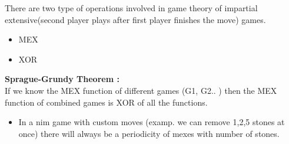 \documentclass[../Notes.tex]{subfiles}
\begin{document}
There are two type of operations involved in game theory of impartial extensive(second player plays after first player finishes the move) games.
\begin{itemize}
	\item MEX
	\item XOR
\end{itemize}

\textbf{Sprague-Grundy Theorem :} \\

If we know the MEX function of different games (G1, G2.. ) then the MEX function of combined games is XOR of all the functions.

\begin{itemize}
	\item In a nim game with custom moves (examp. we can remove 1,2,5 stones at once) there will always be a periodicity of mexes with number of stones.
\end{itemize}
\end{document}

